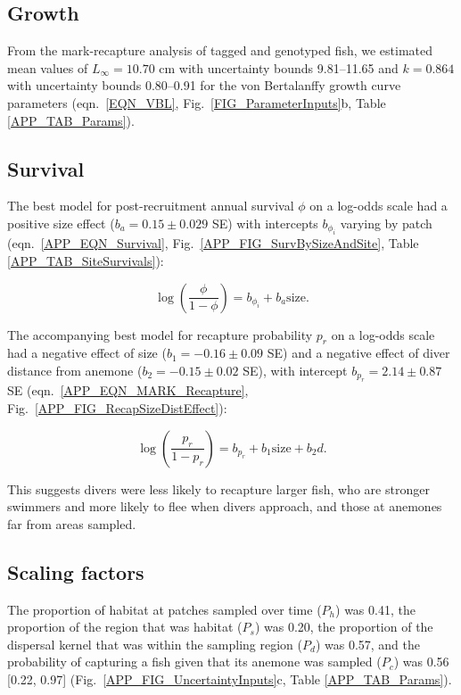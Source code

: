 \documentclass[12pt, oneside]{article}   	%
\begin{document}
\subsection{Growth} \label{APP_SEC_RESULTS_Growth}

From the mark-recapture analysis of tagged and genotyped fish, we estimated mean values of $L_\infty = 10.70$ cm with uncertainty bounds 9.81--11.65 and $k = 0.864$ with uncertainty bounds 0.80--0.91 for the von Bertalanffy growth curve parameters (eqn.\ \ref{EQN_VBL}, Fig.\ \ref{FIG_ParameterInputs}b, Table \ref{APP_TAB_Params}). 

\subsection{Survival} \label{APP_SEC_RESULTS_Survival}

The best model for post-recruitment annual survival $\phi$ on a log-odds scale had a positive size effect ($b_a = 0.15 \pm 0.029$ SE) with intercepts $b_{\phi_i}$ varying by patch (eqn.\ \ref{APP_EQN_Survival}, Fig.\ \ref{APP_FIG_SurvBySizeAndSite}, Table \ref{APP_TAB_SiteSurvivals}):

\begin{equation}
\log(\frac{\phi}{1-\phi}) = b_{\phi_i} + b_a\text{size}. \label{APP_EQN_Survival}
\end{equation}

The accompanying best model for recapture probability $p_r$ on a log-odds scale had a negative effect of size ($b_1 = -0.16 \pm 0.09$ SE) and a negative effect of diver distance from anemone ($b_2 = -0.15 \pm 0.02$ SE), with intercept $b_{p_r} = 2.14 \pm 0.87$ SE (eqn.\ \ref{APP_EQN_MARK_Recapture}, Fig.\ \ref{APP_FIG_RecapSizeDistEffect}):

\begin{equation}
\log(\frac{p_r}{1-p_r}) = b_{p_r} + b_1\text{size} + b_2d. \label{APP_EQN_MARK_Recapture}
\end{equation}

This suggests divers were less likely to recapture larger fish, who are stronger swimmers and more likely to flee when divers approach, and those at anemones far from areas sampled.

\subsection{Scaling factors} \label{APP_SEC_RESULTS_ScalingFactors}

The proportion of habitat at patches sampled over time ($P_h$) was 0.41, the proportion of the region that was habitat ($P_s$) was 0.20, the proportion of the dispersal kernel that was within the sampling region ($P_d$) was 0.57, and the probability of capturing a fish given that its anemone was sampled ($P_c$) was 0.56 [0.22, 0.97] (Fig.\ \ref{APP_FIG_UncertaintyInputs}c, Table \ref{APP_TAB_Params}).
\end{document}
